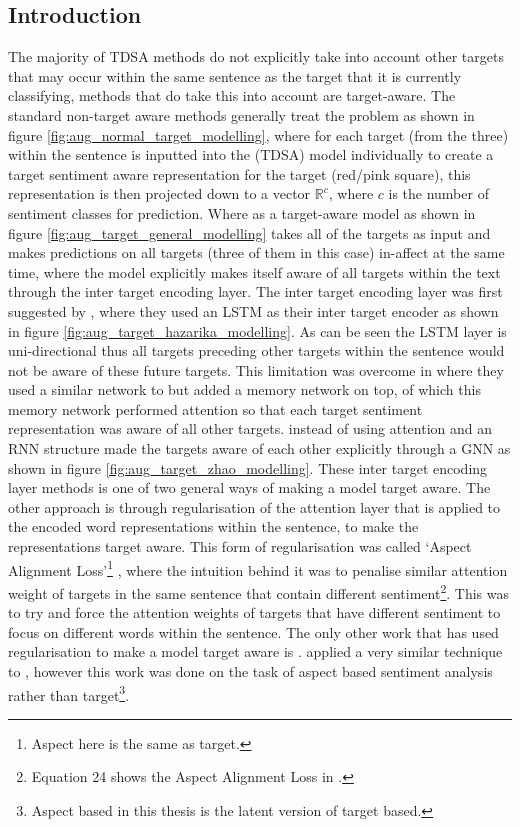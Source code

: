 \subsection{Introduction}
The majority of TDSA methods do not explicitly take into account other targets that may occur within the same sentence as the target that it is currently classifying, methods that do take this into account are target-aware. The standard non-target aware methods generally treat the problem as shown in figure \ref{fig:aug_normal_target_modelling}, where for each target (from the three) within the sentence is inputted into the (TDSA) model individually to create a target sentiment aware representation for the target (red/pink square), this representation is then projected down to a vector $\mathbb{R}^{c}$, where $c$ is the number of sentiment classes for prediction. Where as a target-aware model as shown in figure \ref{fig:aug_target_general_modelling} takes all of the targets as input and makes predictions on all targets (three of them in this case) in-affect at the same time, where the model explicitly makes itself aware of all targets within the text through the inter target encoding layer. The inter target encoding layer was first suggested by \citet{hazarika-etal-2018-modeling}, where they used an LSTM as their inter target encoder as shown in figure \ref{fig:aug_target_hazarika_modelling}. As can be seen the LSTM layer is uni-directional thus all targets preceding other targets within the sentence would not be aware of these future targets. This limitation was overcome in \citet{majumder-etal-2018-iarm} where they used a similar network to \citet{hazarika-etal-2018-modeling} but added a memory network on top, of which this memory network performed attention so that each target sentiment representation was aware of all other targets. \citet{zhao2019modeling} instead of using attention and an RNN structure made the targets aware of each other explicitly through a GNN as shown in figure \ref{fig:aug_target_zhao_modelling}. These inter target encoding layer methods is one of two general ways of making a model target aware. The other approach is through regularisation of the attention layer \citep{fan-etal-2018-multi} that is applied to the encoded word representations within the sentence, to make the representations target aware. This form of regularisation was called `Aspect Alignment Loss'\footnote{Aspect here is the same as target.} \citep{fan-etal-2018-multi}, where the intuition behind it was to penalise similar attention weight of targets in the same sentence that contain different sentiment\footnote{Equation 24 shows the Aspect Alignment Loss in \citet{fan-etal-2018-multi}.}. This was to try and force the attention weights of targets that have different sentiment to focus on different words within the sentence. The only other work that has used regularisation to make a model target aware is \citet{hu-etal-2019-constrained}. \citet{hu-etal-2019-constrained} applied a very similar technique to \citet{fan-etal-2018-multi}, however this work was done on the task of aspect based sentiment analysis rather than target\footnote{Aspect based in this thesis is the latent version of target based.}.

